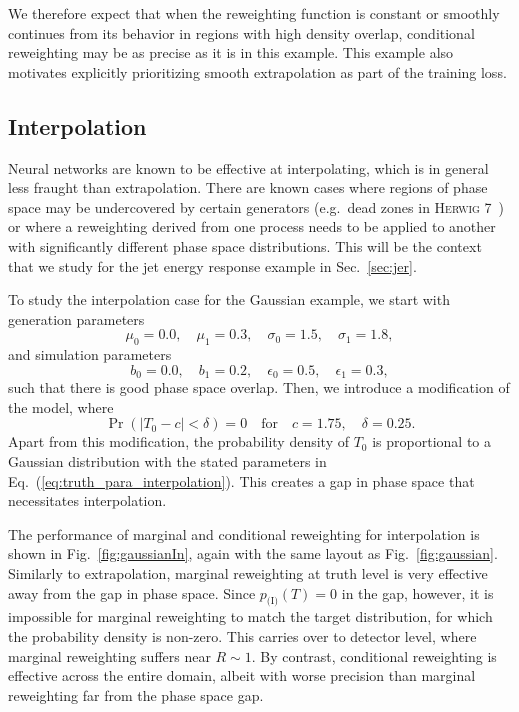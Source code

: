 \documentclass[aps,prx,reprint,preprintnumbers,superscriptaddress,nofootinbib,longbibliography,floatfix]{revtex4-2}
\DeclareRobustCommand{\Sec}[1]{Sec.~\ref{sec:#1}}
\DeclareRobustCommand{\Fig}[1]{Fig.~\ref{fig:#1}}
\DeclareRobustCommand{\Eq}[1]{Eq.~(\ref{eq:#1})}
\begin{document}
We therefore expect that when the reweighting function is constant or smoothly continues from its behavior in regions with high density overlap, conditional reweighting may be as precise as it is in this example.
%
This example also motivates explicitly prioritizing smooth extrapolation as part of the training loss.


\subsection{Interpolation}
\label{sec:gauss_interpolation}



Neural networks are known to be effective at interpolating, which is in general less fraught than extrapolation.
%
There are known cases where regions of phase space may be undercovered by certain generators (e.g.\ dead zones in \textsc{Herwig} 7~\cite{Reichelt:2017hts}) or where a reweighting derived from one process needs to be applied to another with significantly different phase space distributions.
%
This will be the context that we study for the jet energy response example in \Sec{jer}.


To study the interpolation case for the Gaussian example, we start with generation parameters
%
\begin{equation}
\label{eq:truth_para_interpolation}
\mu_0=0.0, \quad \mu_1=0.3, \quad \sigma_0=1.5, \quad \sigma_1=1.8,
\end{equation}
%
and simulation parameters
%
\begin{equation}
    b_0=0.0,\quad b_1=0.2, \quad \epsilon_0=0.5, \quad \epsilon_1=0.3,
\end{equation}
%
such that there is good phase space overlap.
%
Then, we introduce a modification of the model, where
%
\begin{equation}
\Pr(|T_0-c| < \delta)=0 \quad  \text{for} \quad c=1.75, \quad \delta=0.25.
\end{equation}
%
Apart from this modification, the probability density of $T_0$ is proportional to a Gaussian distribution with the stated parameters in \Eq{truth_para_interpolation}.
%
This creates a gap in phase space that necessitates interpolation.


The performance of marginal and conditional reweighting for interpolation is shown in \Fig{gaussianIn}, again with the same layout as \Fig{gaussian}.
%
Similarly to extrapolation, marginal reweighting at truth level is very effective away from the gap in phase space.
%
Since $p_{\text{(I)}}(T)=0$ in the gap, however, it is impossible for marginal reweighting to match the target distribution, for which the probability density is non-zero.
%
This carries over to detector level, where marginal reweighting suffers near $R\sim 1$.
%
By contrast, conditional reweighting is effective across the entire domain, albeit with worse precision than marginal reweighting far from the phase space gap.
\end{document}
